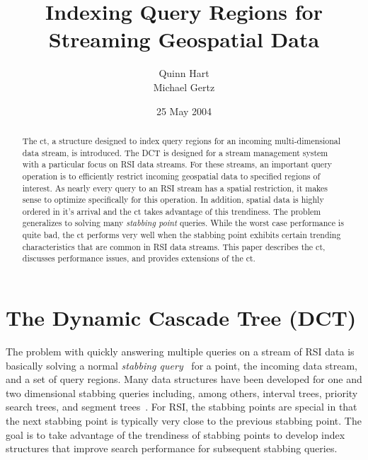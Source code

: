 \documentclass{stdbm}
\title{Indexing Query Regions for Streaming Geospatial Data}
\author{\parbox{6in}{\parbox{2.5in}{\center Quinn Hart} \hfill \parbox{2.5in}{\center Michael Gertz}}}
\date{25 May 2004}
\begin{document}
\maketitle
\begin{abstract}
  
  The \acf{ct}, a structure designed to index query regions for an
  incoming multi-dimensional data stream, is introduced.  The DCT is
  designed for a stream management system with a particular focus on
  \acf{RSI} data streams.  For these streams, an important query
  operation is to efficiently restrict incoming geospatial data to
  specified regions of interest.  As nearly every query to an RSI
  stream has a spatial restriction, it makes sense to optimize
  specifically for this operation.  In addition, spatial data is
  highly ordered in it's arrival and the \ac{ct} takes advantage of
  this trendiness.  The problem generalizes to solving many
  \emph{stabbing point} queries.  While the worst case performance is
  quite bad, the \ac{ct} performs very well when the stabbing point
  exhibits certain trending characteristics that are common in
  RSI data streams. This paper describes the \ac{ct}, discusses
  performance issues, and provides extensions of the \ac{ct}.
\end{abstract}




\vspace*{-1ex}
\section{The Dynamic Cascade Tree (DCT)}
\label{sec:dct}

The problem with quickly answering multiple queries on a stream of RSI
data is basically solving a normal \emph{stabbing
  query}~\cite{berg00comput-geomet} for a point, the incoming data
stream, and a set of query regions. Many data structures have been
developed for one and two dimensional stabbing queries including,
among others, interval trees, priority search trees, and segment
trees~\cite{berg00comput-geomet}.  For \ac{RSI}, the stabbing points
are special in that the next stabbing point is typically very close to
the previous stabbing point.  The goal is to take advantage of the
trendiness of stabbing points to develop index structures that improve
search performance for subsequent stabbing queries.
\end{document}

